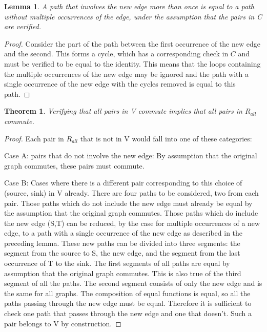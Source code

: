 \documentclass{article}
\newtheorem{lemma}{Lemma}
\newtheorem{theorem}{Theorem}
\begin{document}
\begin{lemma}
A path that involves the new edge more than once is equal to a path without multiple occurrences of the edge, under the assumption that the pairs in C are verified.
\end{lemma}
\begin{proof}
Consider the part of the path between the first occurrence of the new edge and the second. This forms a cycle, which has a corresponding check in $C$ and must be verified to be equal to the identity.
This means that the loops containing the multiple occurrences of the new edge may be ignored and the path with a single occurrence of the new edge with the cycles removed is equal to this path.
\end{proof}

\begin{theorem}
\label{verifyingSet}
Verifying that all pairs in V commute implies that all pairs in $R_{all}$ commute.
\end{theorem}
\begin{proof}

Each pair in $R_{all}$ that is not in V would fall into one of these categories:

Case A: pairs that do not involve the new edge: By assumption that the original graph commutes, these pairs must commute.

Case B: Cases where there is a different pair corresponding to this choice of (source, sink) in V already.
There are four paths to be considered, two from each pair. Those paths which do not include the new edge must already be equal by the assumption that the original graph commutes.
Those paths which do include the new edge (S,T) can be reduced, by the case for multiple occurrences of a new edge, to a path with a single occurrence of the new edge as described in the preceding lemma. These new paths can be divided into three segments: the segment from the source to S, the new edge, and the segment from the last occurrence of T to the sink. The first segments of all paths are equal by assumption that the original graph commutes. This is also true of the third segment of all the paths. The second segment consists of only the new edge and is the same for all graphs. The composition of equal functions is equal, so all the paths passing through the new edge must be equal.
Therefore it is sufficient to check one path that passes through the new edge and one that doesn't. Such a pair belongs to V by construction.
\end{proof}
\end{document}

